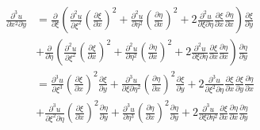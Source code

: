 \documentclass[twoside, 11pt, a4paper]{article}
\begin{document}
\newpage
\[
  \begin{split}
    \frac{\partial^3u}{\partial x^2\partial y} &= \frac{\partial}{\partial\xi}\left(\frac{\partial^2u}{\partial \xi^2}\left(\frac{\partial\xi}{\partial x}\right)^2 + \frac{\partial^2u}{\partial \eta^2}\left(\frac{\partial\eta}{\partial x}\right)^2 + 2 \frac{\partial^2u}{\partial\xi\partial\eta}\frac{\partial\xi}{\partial x}\frac{\partial\eta}{\partial x}\right)\frac{\partial\xi}{\partial y} \\
    &+\frac{\partial}{\partial\eta}\left(\frac{\partial^2u}{\partial \xi^2}\left(\frac{\partial\xi}{\partial x}\right)^2 + \frac{\partial^2u}{\partial \eta^2}\left(\frac{\partial\eta}{\partial x}\right)^2 + 2 \frac{\partial^2u}{\partial\xi\partial\eta}\frac{\partial\xi}{\partial x}\frac{\partial\eta}{\partial x}\right)\frac{\partial\eta}{\partial y} \\
    &= \frac{\partial^3u}{\partial\xi^3}\left(\frac{\partial\xi}{\partial x}\right)^2\frac{\partial\xi}{\partial y} + \frac{\partial^3u}{\partial\xi\partial\eta^2}\left(\frac{\partial\eta}{\partial x}\right)^2\frac{\partial\xi}{\partial y} + 2\frac{\partial^3u}{\partial\xi^2\partial\eta}\frac{\partial\xi}{\partial x}\frac{\partial\xi}{\partial y}\frac{\partial\eta}{\partial x} \\
    &+ \frac{\partial^3u}{\partial\xi^2\partial\eta}\left(\frac{\partial\xi}{\partial x}\right)^2\frac{\partial\eta}{\partial y}+\frac{\partial^3u}{\partial\eta^3}\left(\frac{\partial\eta}{\partial x}\right)^2\frac{\partial\eta}{\partial y} + 2\frac{\partial^3u}{\partial\xi\partial\eta^2}\frac{\partial\xi}{\partial x}\frac{\partial\eta}{\partial x}\frac{\partial\eta}{\partial y}
  \end{split}
\]
\end{document}
